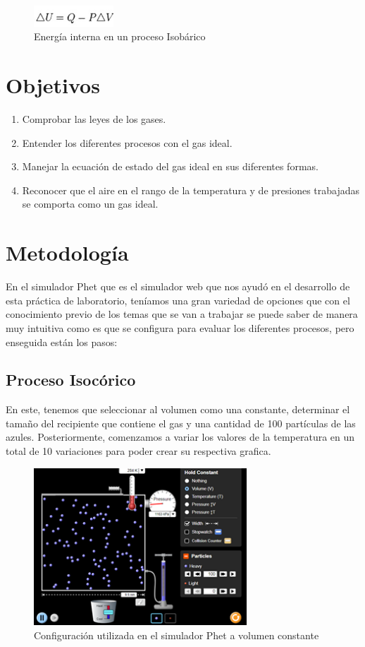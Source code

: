\documentclass[journal,transmag]{IEEEtran}
\begin{document}
\begin{figure}[!h]
				\center
				\includegraphics[width=3cm]{img/8.jpeg}
				\caption{Energía interna en un proceso Isobárico}
				\label{f8}
	\end{figure}
\section{Objetivos}

	\begin{enumerate}
		\item Comprobar las leyes de los gases.
		\item Entender los diferentes procesos con el gas ideal.
		\item Manejar la ecuación de estado del gas ideal en sus diferentes formas.
		\item Reconocer que el aire en el rango de la temperatura y de presiones trabajadas se comporta como un gas ideal.
	\end{enumerate}
	

\section{Metodología}

En el simulador Phet que es el simulador web que nos ayudó en el desarrollo de esta práctica de laboratorio, teníamos una gran variedad de opciones que con el conocimiento previo de los temas que se van a trabajar se puede saber de manera muy intuitiva como es que se configura para evaluar los diferentes procesos, pero enseguida están los pasos:  

\subsection{\textbf{Proceso Isocórico }}
En este, tenemos que seleccionar al volumen como una constante, determinar el tamaño del recipiente que contiene el gas y una cantidad de 100 partículas de las azules. Posteriormente, comenzamos a variar los valores de la temperatura en un total de 10 variaciones para poder crear su respectiva grafica. 

\begin{figure}[!h]
				\center
				\includegraphics[width=8cm]{img/isoco.png}
				\caption{Configuración utilizada en el simulador Phet a volumen constante}
				\label{f9}
	\end{figure}
\end{document}
